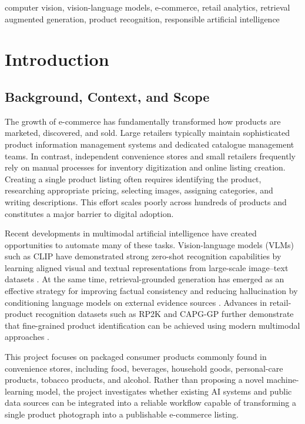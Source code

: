 \documentclass[conference]{IEEEtran}
\begin{document}
\begin{IEEEkeywords}
computer vision,
vision-language models,
e-commerce,
retail analytics,
retrieval augmented generation,
product recognition,
responsible artificial intelligence
\end{IEEEkeywords}



\section{Introduction}

\subsection{Background, Context, and Scope}

The growth of e-commerce has fundamentally transformed how products are marketed, discovered, and sold. Large retailers typically maintain sophisticated product information management systems and dedicated catalogue management teams. In contrast, independent convenience stores and small retailers frequently rely on manual processes for inventory digitization and online listing creation. Creating a single product listing often requires identifying the product, researching appropriate pricing, selecting images, assigning categories, and writing descriptions. This effort scales poorly across hundreds of products and constitutes a major barrier to digital adoption.

Recent developments in multimodal artificial intelligence have created opportunities to automate many of these tasks. Vision-language models (VLMs) such as CLIP have demonstrated strong zero-shot recognition capabilities by learning aligned visual and textual representations from large-scale image–text datasets \cite{radford2021clip}. At the same time, retrieval-grounded generation has emerged as an effective strategy for improving factual consistency and reducing hallucination by conditioning language models on external evidence sources \cite{li2024modict}. Advances in retail-product recognition datasets such as RP2K and CAPG-GP further demonstrate that fine-grained product identification can be achieved using modern multimodal approaches \cite{peng2020rp2k,geng2018capg}.

This project focuses on packaged consumer products commonly found in convenience stores, including food, beverages, household goods, personal-care products, tobacco products, and alcohol. Rather than proposing a novel machine-learning model, the project investigates whether existing AI systems and public data sources can be integrated into a reliable workflow capable of transforming a single product photograph into a publishable e-commerce listing.
\end{document}
